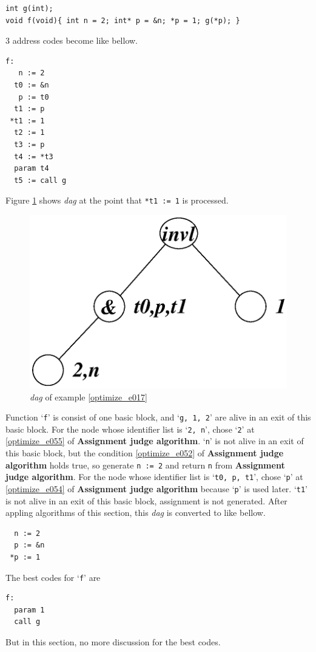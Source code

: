 \begin{Example}
\begin{verbatim}
int g(int);
void f(void){ int n = 2; int* p = &n; *p = 1; g(*p); }
\end{verbatim}
3 address codes become like bellow.
\begin{verbatim}
f:
   n := 2
  t0 := &n
   p := t0
  t1 := p
 *t1 := 1
  t2 := 1
  t3 := p
  t4 := *t3
  param t4
  t5 := call g
\end{verbatim}
Figure \ref{optimize_e018} shows {\em dag} at the point that
{\tt{*t1 := 1}} is processed.
\begin{figure}[htbp]
\begin{center}
\includegraphics[width=0.8\linewidth,height=0.525\linewidth]{opt007.eps}
\caption{{\em dag} of example \ref{optimize_e017}}
\label{optimize_e018}
\end{center}
\end{figure}
Function `{\tt{f}}' is consist of one basic block, and 
`{\tt{g, 1, 2}}' are alive in an exit of this basic block.
For the node whose identifier list is `{\tt{2, n}}',
chose `{\tt{2}}' at \ref{optimize_e055} of {\bf Assignment judge algorithm}.
`{\tt{n}}' is not alive in an exit of this basic block, but
the condition \ref{optimize_e052} of {\bf Assignment judge algorithm}
holds true, so generate {\tt{n := 2}} and return {\tt{n}} from
{\bf Assignment judge algorithm}.
For the node whose identifier list is `{\tt{t0, p, t1}}',
chose `{\tt{p}}' at \ref{optimize_e054} of {\bf Assignment judge
 algorithm} because `{\tt{p}}' is used later.
 `{\tt{t1}}' is not alive in an exit of this basic block,
assignment is not generated.
After appling algorithms of this section,
this {\em dag} is converted to like bellow.
\begin{verbatim}
  n := 2
  p := &n
 *p := 1
\end{verbatim}
The best codes for `{\tt{f}}' are
\begin{verbatim}
f:
  param 1
  call g
\end{verbatim}
But in this section, no more discussion for the best codes.
\end{Example}


